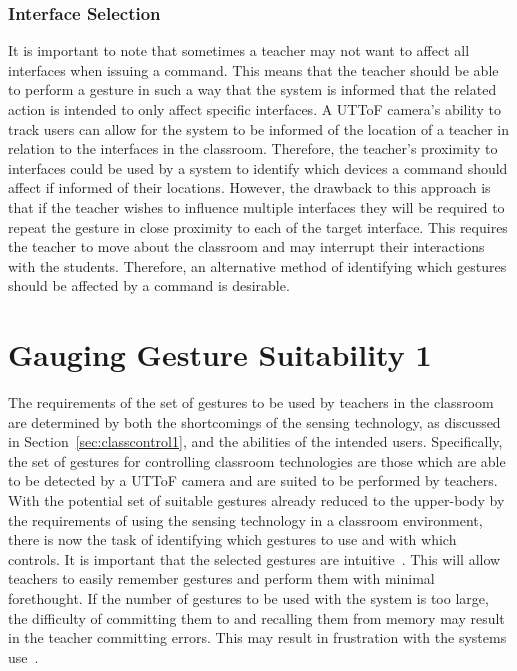 \documentclass[manuscript, review, screen]{acmart}
\begin{document}
\subsubsection{Interface Selection}  
\label{sec:selection}

It is important to note that sometimes a teacher may not want to affect all interfaces when issuing a command.
This means that the teacher should be able to perform a gesture in such a way that the system is informed that the related action is intended to only affect specific interfaces.
A \ac{UTToF} camera's ability to track users can allow for the system to be informed of the location of a teacher in relation to the interfaces in the classroom.
Therefore, the teacher's proximity to interfaces could be used by a system to identify which devices a command should affect if informed of their locations.
However, the drawback to this approach is that if the teacher wishes to influence multiple interfaces they will be required to repeat the gesture in close proximity to each of the target interface.
This requires the teacher to move about the classroom and may interrupt their interactions with the students.
Therefore, an alternative method of identifying which gestures should be affected by a command is desirable.


\section{Gauging Gesture Suitability 1} 
\label{sec:gestures1}


The requirements of the set of gestures to be used by teachers in the classroom are determined by both the shortcomings of the sensing technology, as discussed in Section~\ref{sec:classcontrol1}, and the abilities of the intended users.
Specifically, the set of gestures for controlling classroom technologies are those which are able to be detected by a \ac{UTToF} camera and are suited to be performed by teachers.
With the potential set of suitable gestures already reduced to the upper-body by the requirements of using the sensing technology in a classroom environment, there is now the task of identifying which gestures to use and with which controls.
It is important that the selected gestures are intuitive~\cite{Cohen,Wachs2011}.
This will allow teachers to easily remember gestures and perform them with minimal forethought.
If the number of gestures to be used with the system is too large, the difficulty of committing them to and recalling them from memory may result in the teacher committing errors.
This may result in frustration with the systems use~\cite{Mendoza2005}.
\end{document}
